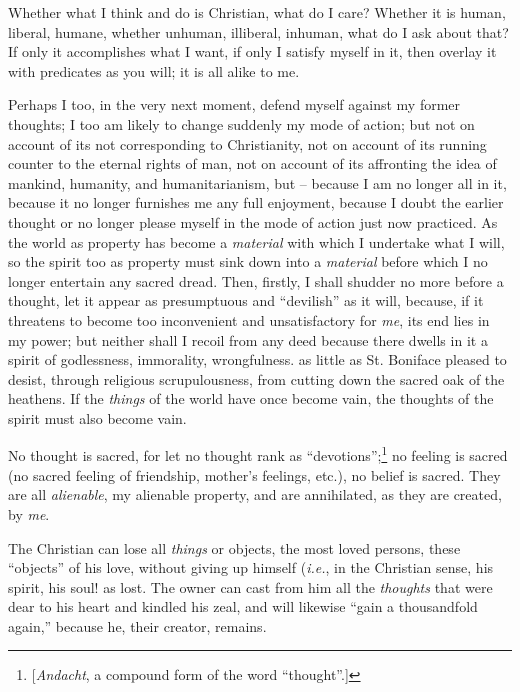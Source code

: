 \myhrule


Whether what I think and do is Christian, what do I care? Whether it is human, 
liberal, humane, whether unhuman, illiberal, inhuman, what do I ask about 
that? If only it accomplishes what I want, if only I satisfy myself in it, 
then overlay it with predicates as you will; it is all alike to me.

Perhaps I too, in the very next moment, defend myself against my former 
thoughts; I too am likely to change suddenly my mode of action; but not on 
account of its not corresponding to Christianity, not on account of its 
running counter to the eternal rights of man, not on account of its affronting 
the idea of mankind, humanity, and humanitarianism, but -- because I am no 
longer all in it, because it no longer furnishes me any full enjoyment, 
because I doubt the earlier thought or no longer please myself in the mode of 
action just now practiced. As the world as property has become a 
\textit{material} with which I undertake what I will, so the spirit too as 
property must sink down into a \textit{material} before which I no longer 
entertain any sacred dread. Then, firstly, I shall shudder no more before a 
thought, let it appear as presumptuous and ``devilish'' as it will, because, 
if it threatens to become too inconvenient and unsatisfactory for \textit{me}, 
its end lies in my power; but neither shall I recoil from any deed because 
there dwells in it a spirit of godlessness, immorality, wrongfulness. as 
little as St. Boniface pleased to desist, through religious scrupulousness, 
from cutting down the sacred oak of the heathens. If the \textit{things} of 
the world have once become vain, the thoughts of the spirit must also become 
vain.

No thought is sacred, for let no thought rank as 
``devotions'';\footnote{[\textit{Andacht}, a compound form of the word 
``thought''.]} no feeling is sacred (no sacred feeling of friendship, 
mother's feelings, etc.), no belief is sacred. They are all 
\textit{alienable}, my alienable property, and are annihilated, as they are 
created, by \textit{me}.

The Christian can lose all \textit{things} or objects, the most loved persons, 
these ``objects'' of his love, without giving up himself (\textit{i.e.}, in 
the Christian sense, his spirit, his soul! as lost. The owner can cast from 
him all the \textit{thoughts} that were dear to his heart and kindled his 
zeal, and will likewise ``gain a thousandfold again,'' because he, their 
creator, remains.

